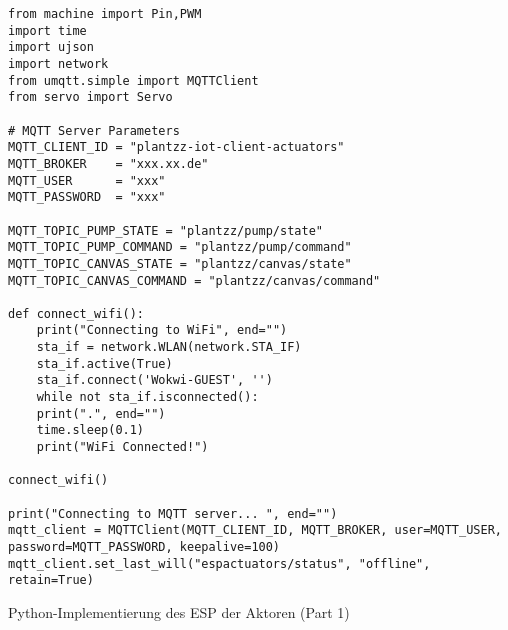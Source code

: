 \begin{listing}[!ht]
\begin{verbatim}
from machine import Pin,PWM
import time
import ujson
import network
from umqtt.simple import MQTTClient 
from servo import Servo

# MQTT Server Parameters
MQTT_CLIENT_ID = "plantzz-iot-client-actuators"
MQTT_BROKER    = "xxx.xx.de"
MQTT_USER      = "xxx"
MQTT_PASSWORD  = "xxx"

MQTT_TOPIC_PUMP_STATE = "plantzz/pump/state"
MQTT_TOPIC_PUMP_COMMAND = "plantzz/pump/command"
MQTT_TOPIC_CANVAS_STATE = "plantzz/canvas/state"
MQTT_TOPIC_CANVAS_COMMAND = "plantzz/canvas/command"

def connect_wifi():
    print("Connecting to WiFi", end="")
    sta_if = network.WLAN(network.STA_IF)
    sta_if.active(True)
    sta_if.connect('Wokwi-GUEST', '')
    while not sta_if.isconnected():
    print(".", end="")
    time.sleep(0.1)
    print("WiFi Connected!")

connect_wifi()

print("Connecting to MQTT server... ", end="")
mqtt_client = MQTTClient(MQTT_CLIENT_ID, MQTT_BROKER, user=MQTT_USER, password=MQTT_PASSWORD, keepalive=100)
mqtt_client.set_last_will("espactuators/status", "offline", retain=True)
\end{verbatim}
\caption{Python-Implementierung des ESP der Aktoren (Part 1)}
\label{list:wokwi_aktoren1}
\end{listing}

